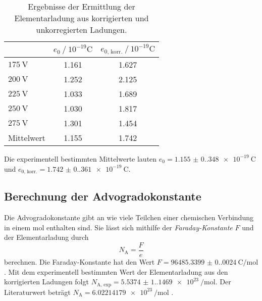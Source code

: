 \begin{table}
    \centering
    \caption{Ergebnisse der Ermittlung der Elementarladung aus korrigierten und unkorregierten Ladungen.}
    \label{tab:elementar}
    \begin{tabular}{l S[table-format = 1.3] S}
      \toprule
        {} & {$e_0 \mathbin{/} 10^{-19} \unit{\coulomb}$} & {$e_{0\text{, korr.}} \mathbin{/} 10^{-19} \unit{\coulomb}$} \\
        \midrule
        {$\qty{175}{\volt}$} & 1.161 & 1.627 \\
        {$\qty{200}{\volt}$} & 1.252 & 2.125 \\
        {$\qty{225}{\volt}$} & 1.033 & 1.689 \\
        {$\qty{250}{\volt}$} & 1.030 & 1.817 \\
        {$\qty{275}{\volt}$} & 1.301 & 1.454 \\
        {Mittelwert}         & 1.155 & 1.742 \\
      \bottomrule
    \end{tabular}
  \end{table}
Die experimentell bestimmten Mittelwerte lauten $e_0 = \qty{1.155(0.348)e-19}{\coulomb}$ und $e_{0 \text{, korr.}} = \qty{1.742(0.361)e-19}{\coulomb}$. 
\subsection{Berechnung der Advogradokonstante}
\label{subsec:Avogadro}
Die Advogradokonstante gibt an wie viele Teilchen einer chemischen Verbindung in einem $\unit{\mol}$ enthalten sind.
Sie lässt sich mithilfe der \textit{Faraday-Konstante} $F$ und der Elementarladung durch
\begin{equation*}
    \label{eqn:N_A}
    N_\text{A} = \frac{F}{e}
\end{equation*}
berechnen. Die Faraday-Konstante hat den Wert $F = \qty{96485.3399(0.0024)}{\coulomb\per\mol}$ \cite{Ingenieurwissen}.
Mit dem experimentell bestimmten Wert der Elementarladung aus den korrigierten Ladungen folgt $N_\text{A, exp} = \qty{5.5374(1.1469)e23}{\per\mol}$.
Der Literaturwert beträgt $N_\text{A} = \qty{6.02214179e23}{\per\mol}$ \cite{Ingenieurwissen}.
